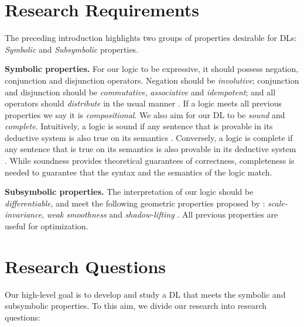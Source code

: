 \section{Research Requirements}
The preceding introduction highlights two groups of properties desirable for DLs: \emph{Symbolic} and \emph{Subsymbolic} properties. 

\textbf{Symbolic properties.} For our logic to be expressive, it should possess negation, conjunction and disjunction operators. Negation should be \emph{involutive}; conjunction and disjunction should be \emph{commutative}, \emph{associative} and \emph{idempotent}; and all operators should \emph{distribute} in the usual manner \mcita{}. If a logic meets all previous properties we say it is \emph{compositional}. We also aim for our DL to be \emph{sound} and \emph{complete}. Intuitively, a logic is sound if any sentence that is provable in its deductive system is also true on its semantics \mcita{}. Conversely, a logic is complete if any sentence that is true on its semantics is also provable in its deductive system \mcita{}. While soundness provides theoretical guarantees of correctness, completeness is needed to guarantee that the syntax and the semantics of the logic match.

\textbf{Subsymbolic properties.} The interpretation of our logic should be \emph{differentiable}, and meet the following geometric properties proposed by \mcita{}: \emph{scale-invariance}, \emph{weak smoothness} and \emph{shadow-lifting} \mcita{}. All previous properties are useful for optimization. %

\section{Research Questions}

Our high-level goal is to develop and study a DL that meets the symbolic and subsymbolic properties. To this aim, we divide our research into \yada{} research questions:

